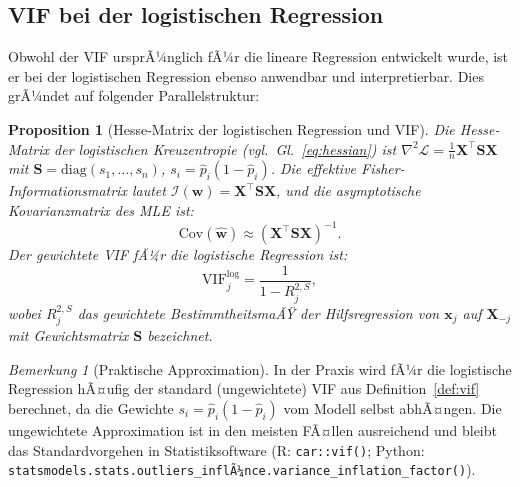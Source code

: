 ﻿\documentclass[12pt, a4paper]{article}
\newtheorem{proposition}[theorem]{Proposition}
\theoremstyle{definition}
\theoremstyle{remark}
\newtheorem{remark}[theorem]{Bemerkung}
\newcommand{\vw}{\bm{w}}
\newcommand{\vx}{\bm{x}}
\newcommand{\vX}{\bm{X}}
\newcommand{\vS}{\bm{S}}
\newcommand{\T}{\top}
\newcommand{\diag}{\mathrm{diag}}
\begin{document}
\subsection{VIF bei der logistischen Regression}

Obwohl der VIF ursprÃ¼nglich fÃ¼r die lineare Regression entwickelt wurde, ist er bei der
logistischen Regression ebenso anwendbar und interpretierbar. Dies grÃ¼ndet auf folgender
Parallelstruktur:

\begin{proposition}[Hesse-Matrix der logistischen Regression und VIF]
	Die Hesse-Matrix der logistischen Kreuzentropie (vgl.~Gl.~\eqref{eq:hessian}) ist
	$\nabla^2\mathcal{L} = \frac{1}{n}\vX^\T\vS\vX$ mit $\vS = \diag(s_1,\ldots,s_n)$,
	$s_i = \hat{p}_i(1-\hat{p}_i)$. Die effektive Fisher-Informationsmatrix lautet
	$\mathcal{I}(\vw) = \vX^\T\vS\vX$, und die asymptotische Kovarianzmatrix des MLE ist:
	\begin{equation}
		\mathrm{Cov}(\hat{\vw}) \approx (\vX^\T\vS\vX)^{-1}.
		\label{eq:cov_logistic}
	\end{equation}
	Der \emph{gewichtete VIF} fÃ¼r die logistische Regression ist:
	\begin{equation}
		\mathrm{VIF}_j^{\mathrm{log}} = \frac{1}{1 - R_j^{2,S}},
		\label{eq:vif_logistic}
	\end{equation}
	wobei $R_j^{2,S}$ das gewichtete BestimmtheitsmaÃŸ der Hilfsregression von $\vx_j$ auf
	$\vX_{-j}$ mit Gewichtsmatrix $\vS$ bezeichnet.
\end{proposition}

\begin{remark}[Praktische Approximation]
	In der Praxis wird fÃ¼r die logistische Regression hÃ¤ufig der standard (ungewichtete)
	VIF aus Definition~\ref{def:vif} berechnet, da die Gewichte $s_i = \hat{p}_i(1-\hat{p}_i)$
	vom Modell selbst abhÃ¤ngen. Die ungewichtete Approximation ist in den meisten FÃ¤llen
	ausreichend und bleibt das Standardvorgehen in Statistiksoftware
	(R: \texttt{car::vif()}; Python: \texttt{statsmodels.stats.outliers\_inflÃ¼nce.variance\_inflation\newline \_factor()}).
\end{remark}
\end{document}
